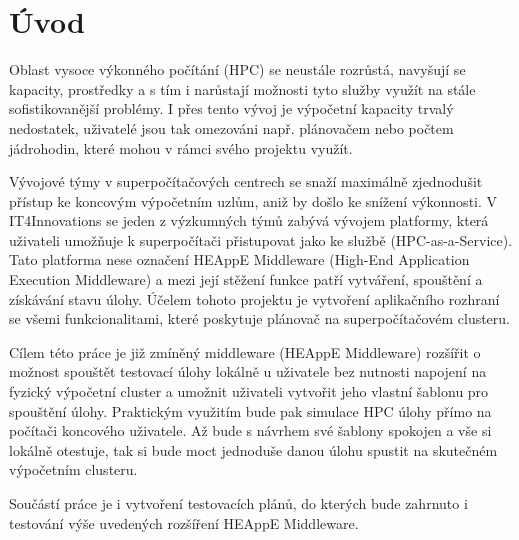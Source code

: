 \chapter{Úvod}
\label{sec:Introduction}
Oblast vysoce výkonného počítání (HPC) se neustále rozrůstá, navyšují se kapacity, prostředky a s tím i narůstají možnosti tyto služby využít na stále sofistikovanější problémy. I přes tento vývoj je výpočetní kapacity trvalý nedostatek, uživatelé jsou tak omezováni např. plánovačem nebo počtem jádrohodin, které mohou v rámci svého projektu využít.

Vývojové týmy v superpočítačových centrech se snaží maximálně zjednodušit přístup ke koncovým výpočetním uzlům, aniž by došlo ke snížení výkonnosti. V IT4Innovations se jeden z výzkumných týmů zabývá vývojem platformy, která uživateli umožňuje k superpočítači přistupovat jako ke službě (HPC-as-a-Service). Tato platforma nese označení HEAppE Middleware (High-End Application Execution Middleware) a mezi její stěžení funkce patří vytváření, spouštění a získávání stavu úlohy. Účelem tohoto projektu je vytvoření aplikačního rozhraní se všemi funkcionalitami, které poskytuje plánovač na superpočítačovém clusteru. 

Cílem této práce je již zmíněný middleware (HEAppE Middleware) rozšířit o možnost spouštět testovací úlohy lokálně u uživatele bez nutnosti napojení na fyzický výpočetní cluster a umožnit uživateli vytvořit jeho vlastní šablonu pro spouštění úlohy. Praktickým využitím bude pak simulace HPC úlohy přímo na počítači koncového uživatele. Až bude s návrhem své šablony spokojen a vše si lokálně otestuje, tak si bude moct jednoduše danou úlohu spustit na skutečném výpočetním clusteru.

Součástí práce je i vytvoření testovacích plánů, do kterých bude zahrnuto i testování výše uvedených rozšíření HEAppE Middleware.
\endinput
